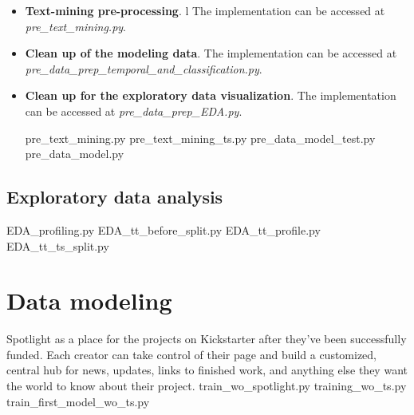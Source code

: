 \documentclass{article}
\begin{document}
{\begin{itemize}
    Check projects by year (state changed) The implementation can be accessed at \emph{pre\_year\_EDA.py}.

Results from pre\_year\_EDA.py

year	percentages	project\_count	
2020	61,0364683301344	1563	
2019	67,2209026128266	16840	18403
2018	54,2246282464195	14593	32996
2017	48,8882229547498	16685	
2016	45,8090641815055	18027	
2015	40,9574019401097	23710	
2014	48,7238557138527	16495	
2013	78,1746632359619	6607	
2012	76,7904781448799	4873	
2011	75,4701211867948	2393	
2010	72,0547945205479	730	
2009	75,6756756756757	74	
		                    122590	

If I use 2020 (1563 projects) and 2019 projects (16840 projects) as test data, I will have 15%
If I use also oct-dec 2018 (26,915735378 %

I also do a random train test split.
        \begin{itemize}
	    \item
	    \item
	\end{itemize}
	
    \item \textbf{Text-mining pre-processing}. l
    The implementation can be accessed at \emph{pre\_text\_mining.py}.
    \item \textbf{Clean up of the modeling data}.
    The implementation can be accessed at \emph{pre\_data\_prep\_temporal\_and\_classification.py}.
    \item \textbf{Clean up for the exploratory data visualization}.
    The implementation can be accessed at \emph{pre\_data\_prep\_EDA.py}.
     
  

                         
    pre\_text\_mining.py
    pre\_text\_mining\_ts.py
    pre\_data\_model\_test.py    
    pre\_data\_model.py 
\end{itemize}

\subsection{Exploratory data analysis}
\label{subsec:EDA}
                   
EDA\_profiling.py                              
EDA\_tt\_before\_split.py                        
EDA\_tt\_profile.py                             
EDA\_tt\_ts\_split.py
\section{Data modeling}
\label{sec:model}
Spotlight as a place for the projects on Kickstarter after they’ve been successfully funded. Each creator can take control of their page and build a customized, central hub for news, updates, links to finished work, and anything else they want the world to know about their project.
train\_wo\_spotlight.py
training\_wo\_ts.py
train\_first\_model\_wo\_ts.py
}
\end{document}
